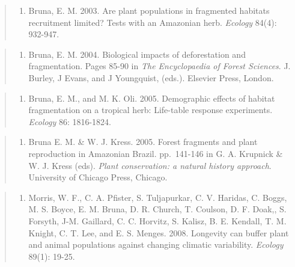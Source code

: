 \documentclass[
  man, donotrepeattitle,floatsintext]{apa6}
\providecommand{\tightlist}{%
  \setlength{\itemsep}{0pt}\setlength{\parskip}{0pt}}
\begin{document}
\begin{quote}
\begin{enumerate}
\def\labelenumi{\arabic{enumi}.}
\setcounter{enumi}{3}
\tightlist
\item
  Bruna, E. M. 2003. Are plant populations in fragmented habitats recruitment limited? Tests with an Amazonian herb. \emph{Ecology} 84(4): 932-947.
\end{enumerate}
\end{quote}

\begin{quote}
\begin{enumerate}
\def\labelenumi{\arabic{enumi}.}
\setcounter{enumi}{4}
\tightlist
\item
  Bruna, E. M. 2004. Biological impacts of deforestation and fragmentation. Pages 85-90 in \emph{The Encyclopaedia of Forest Sciences}. J. Burley, J Evans, and J Youngquist, (eds.). Elsevier Press, London.
\end{enumerate}
\end{quote}

\begin{quote}
\begin{enumerate}
\def\labelenumi{\arabic{enumi}.}
\setcounter{enumi}{5}
\tightlist
\item
  Bruna, E. M., and M. K. Oli. 2005. Demographic effects of habitat fragmentation on a tropical herb: Life-table response experiments. \emph{Ecology} 86: 1816-1824.
\end{enumerate}
\end{quote}

\begin{quote}
\begin{enumerate}
\def\labelenumi{\arabic{enumi}.}
\setcounter{enumi}{6}
\tightlist
\item
  Bruna E. M. \& W. J. Kress. 2005. Forest fragments and plant reproduction in Amazonian Brazil. pp.~141-146 in G. A. Krupnick \& W. J. Kress (eds). \emph{Plant conservation: a natural history approach}. University of Chicago Press, Chicago.
\end{enumerate}
\end{quote}

\begin{quote}
\begin{enumerate}
\def\labelenumi{\arabic{enumi}.}
\setcounter{enumi}{7}
\tightlist
\item
  Morris, W. F., C. A. Pfister, S. Tuljapurkar, C. V. Haridas, C. Boggs, M. S. Boyce, E. M. Bruna, D. R. Church, T. Coulson, D. F. Doak,, S. Forsyth, J-M. Gaillard, C. C. Horvitz, S. Kalisz, B. E. Kendall, T. M. Knight, C. T. Lee, and E. S. Menges. 2008. Longevity can buffer plant and animal populations against changing climatic variability. \emph{Ecology} 89(1): 19-25.
\end{enumerate}
\end{quote}
\end{document}
